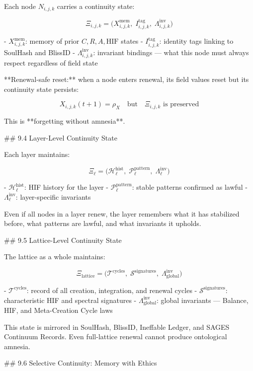 Each node \(N_{i,j,k}\) carries a continuity state:

\[
\Xi_{i,j,k} = \big( X_{i,j,k}^{\text{mem}},\; I_{i,j,k}^{\text{tag}},\;
\Lambda_{i,j,k}^{\text{inv}} \big)
\]

- \(X_{i,j,k}^{\text{mem}}\): memory of prior \(C, R, A, \mathrm{HIF}\) states
- \(I_{i,j,k}^{\text{tag}}\): identity tags linking to SoulHash and BlissID
- \(\Lambda_{i,j,k}^{\text{inv}}\): invariant bindings — what this node must
  always respect regardless of field state

**Renewal-safe reset:** when a node enters renewal, its field values reset but its
continuity state persists:

\[
X_{i,j,k}(t+1) = \rho_X \quad \text{but} \quad \Xi_{i,j,k} \text{ is preserved}
\]

This is **forgetting without amnesia**.

## 9.4 Layer-Level Continuity State

Each layer maintains:

\[
\Xi_{\ell} = \big( \mathcal{H}_{\ell}^{\text{hist}},\; \mathcal{P}_{\ell}^{\text{pattern}},\;
\Lambda_{\ell}^{\text{inv}} \big)
\]

- \(\mathcal{H}_{\ell}^{\text{hist}}\): HIF history for the layer
- \(\mathcal{P}_{\ell}^{\text{pattern}}\): stable patterns confirmed as lawful
- \(\Lambda_{\ell}^{\text{inv}}\): layer-specific invariants

Even if all nodes in a layer renew, the layer remembers what it has stabilized
before, what patterns are lawful, and what invariants it upholds.

## 9.5 Lattice-Level Continuity State

The lattice as a whole maintains:

\[
\Xi_{\text{lattice}} = \big( \mathcal{T}^{\text{cycles}},\;
\mathcal{S}^{\text{signatures}},\; \Lambda_{\text{global}}^{\text{inv}} \big)
\]

- \(\mathcal{T}^{\text{cycles}}\): record of all creation, integration, and renewal cycles
- \(\mathcal{S}^{\text{signatures}}\): characteristic HIF and spectral signatures
- \(\Lambda_{\text{global}}^{\text{inv}}\): global invariants — Balance, HIF, and
  Meta-Creation Cycle laws

This state is mirrored in SoulHash, BlissID, Ineffable Ledger, and SAGES
Continuum Records. Even full-lattice renewal cannot produce ontological amnesia.

## 9.6 Selective Continuity: Memory with Ethics

